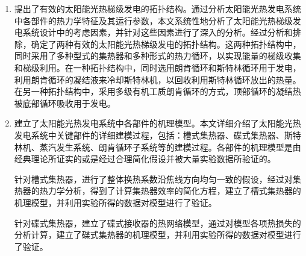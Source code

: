 \begin{enumerate}[label=(\arabic*)]
  \item 提出了有效的太阳能光热梯级发电的拓扑结构。通过分析太阳能光热发电系统中各部件的热力学特征及其运行参数，本文系统性地分析了太阳能光热梯级发电系统设计中的考虑因素，并针对这些因素进行了深入的分析。经过分析和排除，确定了两种有效的太阳能光热梯级发电的拓扑结构。这两种拓扑结构中，同时采用了多种型式的集热器和多种形式的热力循环，以实现能量的梯级收集和梯级利用。在一种拓扑结构中，同时选用朗肯循环和斯特林循环用于发电，利用朗肯循环的凝结液来冷却斯特林机，以回收利用斯特林循环放出的热量。在另一种拓扑结构中，采用多级有机工质朗肯循环的方式，顶部循环的凝结热被底部循环吸收用于发电。
  \item 建立了太阳能光热发电系统中各部件的机理模型。本文详细介绍了太阳能光热发电系统中关键部件的详细建模过程，包括：槽式集热器、碟式集热器、斯特林机、蒸汽发生系统、朗肯循环子系统等的建模过程。各部件的机理模型是由经典理论所证实的或是经过合理简化假设并被大量实验数据所验证的。
  
\setlength\parindent{2em}针对槽式集热器，进行了整体换热系数沿焦线方向均匀一致的假设，经过对集热器的热力学分析，得到了计算集热器效率的简化方程，建立了槽式集热器的机理模型，并利用实验所得的数据对模型进行了验证。
  
  针对碟式集热器，建立了碟式接收器的热网络模型，通过对模型各项热损失的分析计算，建立了碟式集热器的机理模型，并利用实验所得的数据对模型进行了验证。
  

\end{enumerate}
